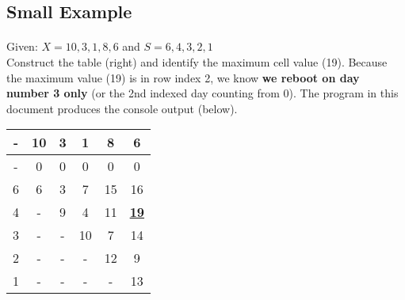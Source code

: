 \documentclass[12pt]{article}
\begin{document}
\subsection{Small Example}
\begin{minipage}{0.6\linewidth}
\paragraph{}
\noindent Given: $X = {10, 3, 1, 8, 6}$ and $S = {6, 4, 3, 2, 1}$ \\
Construct the table (right) and identify the maximum cell value (19).
Because the maximum value (19) is in row index 2, we know \textbf{we reboot on day number 3 only} (or the 2nd indexed day counting from 0). The program in this document produces the console output (below).
\end{minipage}
\hspace{0.05\linewidth}
\begin{minipage}{0.3\linewidth}
\begin{tabular}{|c|c|c|c|c|c|}
\hline
- & 10 & 3 & 1 & 8 & 6 \\ \hline
- & 0 & 0 & 0 & 0 & 0 \\
6 & 6 & 3 & 7 & 15 & 16 \\
4 & - & 9 & 4 & 11 & \underline{\textbf{19}} \\
3 & - & - & 10 & 7 & 14 \\
2 & - & - & - & 12 & 9 \\
1 & - & - & - & - & 13 \\
\hline
\end{tabular}
\end{minipage}
\begin{framed}

\end{framed}
\end{document}
